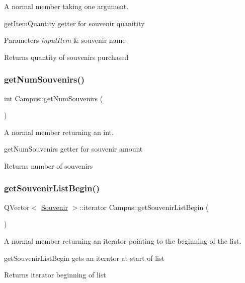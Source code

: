 A normal member taking one argument. 

get\+Item\+Quantity getter for souvenir quanitity 
\begin{DoxyParams}{Parameters}
{\em input\+Item} & souvenir name \\
\hline
\end{DoxyParams}
\begin{DoxyReturn}{Returns}
quantity of souvenirs purchased 
\end{DoxyReturn}
\mbox{\label{class_campus_a082abcb4a749dc02f6202eb5978219f0}} 
\subsubsection{\texorpdfstring{get\+Num\+Souvenirs()}{getNumSouvenirs()}}
{\footnotesize\ttfamily int Campus\+::get\+Num\+Souvenirs (\begin{DoxyParamCaption}{ }\end{DoxyParamCaption})}



A normal member returning an int. 

get\+Num\+Souvenirs getter for souvenir amount \begin{DoxyReturn}{Returns}
number of souvenirs 
\end{DoxyReturn}
\mbox{\label{class_campus_a88b7dc84bb8754c76ec1579e0a075293}} 
\subsubsection{\texorpdfstring{get\+Souvenir\+List\+Begin()}{getSouvenirListBegin()}}
{\footnotesize\ttfamily Q\+Vector$<$ \hyperlink{class_souvenir}{Souvenir} $>$\+::iterator Campus\+::get\+Souvenir\+List\+Begin (\begin{DoxyParamCaption}{ }\end{DoxyParamCaption})}



A normal member returning an iterator pointing to the beginning of the list. 

get\+Souvenir\+List\+Begin gets an iterator at start of list \begin{DoxyReturn}{Returns}
iterator beginning of list 
\end{DoxyReturn}
\mbox{\label{class_campus_ab9e5df7777d19980be0b431774e15063}} 
